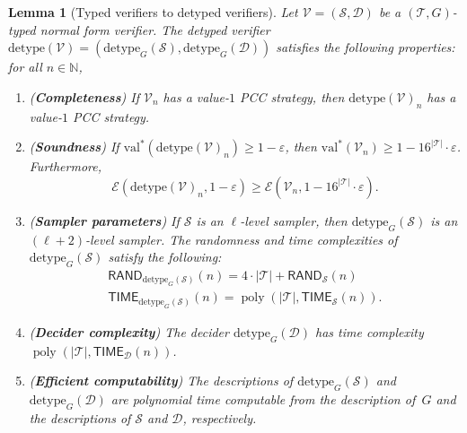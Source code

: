 \documentclass[11pt]{article}
\newtheorem{lemma}[theorem]{Lemma}
\theoremstyle{definition}
\newcommand{\N}{\ensuremath{\mathbb{N}}}
\DeclareMathOperator{\poly}{poly}
\newcommand{\val}{\ensuremath{\mathrm{val}}}
\newcommand{\eps}{\varepsilon}
\newcommand{\sampler}{\mathcal{S}}
\newcommand{\decider}{\mathcal{D}}
\newcommand{\verifier}{\mathcal{V}}
\newcommand{\detype}{\mathrm{detype}}
\newcommand{\type}{\mathcal{T}}
\newcommand{\Ent}{\mathscr{E}}
\newcommand{\TIME}{\mathsf{TIME}}
\newcommand{\RAND}{\mathsf{RAND}}
\begin{document}
\begin{lemma}[Typed verifiers to detyped verifiers]
  \label{lem:detyping-verifiers}
  Let $\verifier = (\sampler,\decider)$ be a $(\type,G)$-typed normal form
  verifier.
  The detyped verifier $\detype(\verifier) =
  (\detype_G(\sampler),\detype_G(\decider))$ satisfies the following properties:
  for all $n \in \N$,
  \begin{enumerate}
	\item (\textbf{Completeness}) If $\verifier_n$ has a value-$1$ PCC strategy,
    then $\detype(\verifier)_n$ has a value-$1$ PCC strategy.
	\item (\textbf{Soundness}) If $\val^*(\detype(\verifier)_n) \geq 1 - \eps$,
    then $\val^*(\verifier_n) \geq 1 - 16^{|\type|} \cdot \eps$.
    Furthermore,
    \[
      \Ent(\detype(\verifier)_n,1 - \eps) \geq
      \Ent(\verifier_n,1 - 16^{|\type|} \cdot\eps).
    \]
	\item (\textbf{Sampler parameters}) If $\sampler$ is an $\ell$-level sampler,
    then $\detype_G(\sampler)$ is an $(\ell+2)$-level sampler.
    The randomness and time complexities of $\detype_G(\sampler)$ satisfy the
    following:
    \begin{gather*}
      \RAND_{\detype_G(\sampler)}(n) = 4\cdot |\type|+ \RAND_\sampler(n) \\
      \TIME_{\detype_G(\sampler)}(n) = \poly(|\type|,\TIME_\sampler(n)).
    \end{gather*}
	\item (\textbf{Decider complexity}) The decider $\detype_G(\decider)$ has time
    complexity $\poly(|\type|,\TIME_\decider(n))$.
	\item (\textbf{Efficient computability}) The descriptions of
    $\detype_G(\sampler)$ and $\detype_G(\decider)$ are polynomial time
    computable from the description of~$G$ and the descriptions of $\sampler$
    and $\decider$, respectively.
  \end{enumerate}
\end{lemma}
\end{document}
